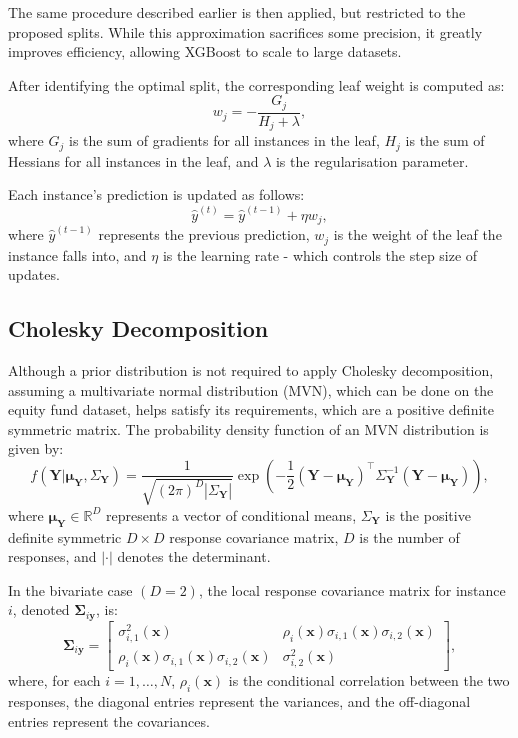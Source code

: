 \documentclass[11pt]{report} %
\begin{document}
The same procedure described earlier is then applied, but restricted to the proposed splits. While this approximation sacrifices some precision, it greatly improves efficiency, allowing XGBoost to scale to large datasets.

After identifying the optimal split, the corresponding leaf weight is computed as:
\[
w_j = -\frac{G_j}{H_j + \lambda},
\]
where \( G_j \) is the sum of gradients for all instances in the leaf, \( H_j \) is the sum of Hessians for all instances in the leaf, and \( \lambda \) is the regularisation parameter.\cite{chen2016xgboost}

\noindent Each instance’s prediction is updated as follows:
\[
\hat{y}^{(t)} = \hat{y}^{(t-1)} + \eta w_j,
\]
\noindent where \( \hat{y}^{(t-1)} \) represents the previous prediction, \( w_j \) is the weight of the leaf the instance falls into, and \( \eta \) is the learning rate - which controls the step size of updates.\cite{chen2016xgboost}

\subsection{Cholesky Decomposition}
Although a prior distribution is not required to apply Cholesky decomposition, assuming a multivariate normal distribution (MVN), which can be done on the equity fund dataset, helps satisfy its requirements, which are a positive definite symmetric matrix.
The probability density function of an MVN distribution is given by:
 \[
f(\mathbf{Y} | \boldsymbol{\mu_\mathbf{Y}}, \Sigma_{\mathbf{Y}}) = \frac{1}{\sqrt{(2\pi)^D |\Sigma_{\mathbf{Y}}|}} 
\exp \left( -\frac{1}{2} (\mathbf{Y} - \boldsymbol{\mu}_{\mathbf{Y}})^\top 
\Sigma_{\mathbf{Y}}^{-1} (\mathbf{Y} - \boldsymbol{\mu}_{\mathbf{Y}}) \right),
\]
where \( \boldsymbol{\mu}_{\mathbf{Y}} \in \mathbb{R}^D \) represents a vector of conditional means, 
\( \Sigma_{\mathbf{Y}} \) is the positive definite symmetric \( D \times D \) response covariance matrix, $D$ is the number of responses, and \( | \cdot | \) denotes the determinant.\cite{marz2022multi} 

In the bivariate case \( (D = 2) \), the local response covariance matrix for instance \( i \), denoted \( \boldsymbol{\Sigma}_{i\mathbf{y}} \), is:
\[
\mathbf{\Sigma}_{i\mathbf{y}} =
\begin{bmatrix}
\sigma^2_{i,1}(\mathbf{x}) & \rho_i(\mathbf{x}) \sigma_{i,1}(\mathbf{x}) \sigma_{i,2}(\mathbf{x}) \\
\rho_i(\mathbf{x}) \sigma_{i,1}(\mathbf{x}) \sigma_{i,2}(\mathbf{x}) & \sigma^2_{i,2}(\mathbf{x})
\end{bmatrix},
\]
where, for each \( i = 1, \dots, N \), $\rho_i(\mathbf{x})$ is the conditional correlation between the two responses, the diagonal entries represent the variances, and the off-diagonal entries represent the covariances.\cite{marz2022multi}
\end{document}
